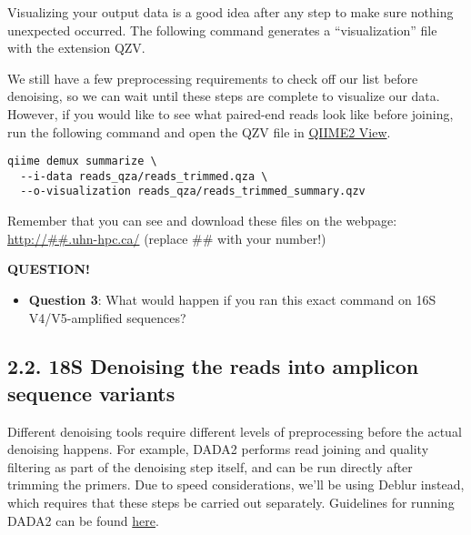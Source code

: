 \documentclass[
]{book}
\providecommand{\tightlist}{%
  \setlength{\itemsep}{0pt}\setlength{\parskip}{0pt}}
\newenvironment{bluebox}{
  \definecolor{shadecolor}{RGB}{172, 210, 237}
  \color{white}
  \begin{shaded}}
 {\end{shaded}}
\begin{document}
Visualizing your output data is a good idea after any step to make sure nothing unexpected occurred. The following command generates a ``visualization'' file with the extension QZV.

We still have a few preprocessing requirements to check off our list before denoising, so we can wait until these steps are complete to visualize our data. However, if you would like to see what paired-end reads look like before joining, run the following command and open the QZV file in \href{https://view.qiime2.org/}{QIIME2 View}.

\begin{verbatim}
qiime demux summarize \
  --i-data reads_qza/reads_trimmed.qza \
  --o-visualization reads_qza/reads_trimmed_summary.qzv
\end{verbatim}

Remember that you can see and download these files on the webpage: \url{http://\#\#.uhn-hpc.ca/} (replace \#\# with your number!)

\begin{bluebox}

\begin{center}
\textbf{QUESTION!}

\end{center}

\begin{itemize}
\tightlist
\item
  \textbf{Question 3}: What would happen if you ran this exact command on 16S V4/V5-amplified sequences?
\end{itemize}

\end{bluebox}

\subsection{2.2. 18S Denoising the reads into amplicon sequence variants}\label{s-denoising-the-reads-into-amplicon-sequence-variants-1}

Different denoising tools require different levels of preprocessing before the actual denoising happens. For example, DADA2 performs read joining and quality filtering as part of the denoising step itself, and can be run directly after trimming the primers. Due to speed considerations, we'll be using Deblur instead, which requires that these steps be carried out separately. Guidelines for running DADA2 can be found \href{https://github.com/LangilleLab/microbiome_helper/wiki/QIIME2-DADA2-Quick-Reference}{here}.
\end{document}
